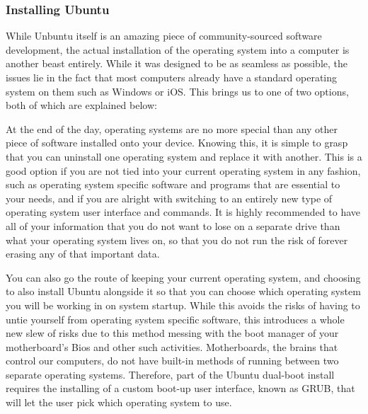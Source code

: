 \documentclass[12pt]{report}
\begin{document}
\subsubsection*{Installing Ubuntu}
While Unbuntu itself is an amazing piece of community-sourced software development, the actual installation of the operating system into a computer is another beast entirely. While it was designed to be as seamless as possible, the issues lie in the fact that most computers already have a standard operating system on them such as Windows or iOS. This brings us to one of two options, both of which are explained below:
\begin{description}[font=$\bullet$~\normalfont\scshape\color{red!50!black}]
	\item [Removing the current operating system and replacing it with Ubuntu] At the end of the day, operating systems are no more special than any other piece of software installed onto your device. Knowing this, it is simple to grasp that you can uninstall one operating system and replace it with another. This is a good option if you are not tied into your current operating system in any fashion, such as operating system specific software and programs that are essential to your needs, and if you are alright with switching to an entirely new type of operating system user interface and commands. It is highly recommended to have all of your information that you do not want to lose on a separate drive than what your operating system lives on, so that you do not run the risk of forever erasing any of that important data.
	\item [Installing Ubuntu beside the current operating sytem with dual-boot] You can also go the route of keeping your current operating system, and choosing to also install Ubuntu alongside it so that you can choose which operating system you will be working in on system startup. While this avoids the risks of having to untie yourself from operating system specific software, this introduces a whole new slew of risks due to this method messing with the boot manager of your motherboard's Bios and other such activities. Motherboards, the brains that control our computers, do not have built-in methods of running between two separate operating systems. Therefore, part of the Ubuntu dual-boot install requires the installing of a custom boot-up user interface, known as GRUB, that will let the user pick which operating system to use.
\end{description}
\end{document}
